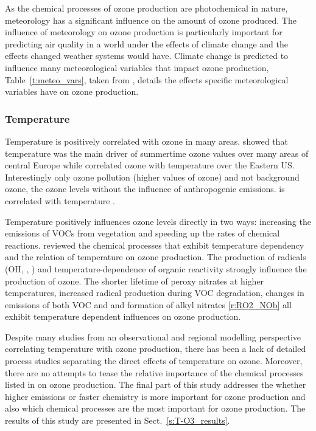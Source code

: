 As the chemical processes of ozone production are photochemical in nature, meteorology has a significant influence on the amount of ozone produced.
The influence of meteorology on ozone production is particularly important for predicting air quality in a world under the effects of climate change and the effects changed weather systems would have.
Climate change is predicted to influence many meteorological variables that impact ozone production, Table~\ref{t:meteo_vars}, taken from \citet{Jacob:2009}, details the effects specific meteorological variables have on ozone production.

\subsubsection{Temperature}
Temperature is positively correlated with ozone in many areas.
\citet{Otero:2016} showed that temperature was the main driver of summertime ozone values over many areas of central Europe while \citet{Camalier:2007} correlated ozone with temperature over the Eastern US.
Interestingly only ozone pollution (higher values of ozone) and not background ozone, the ozone levels without the influence of anthropogenic emissions. is correlated with temperature \citep{Sillman:1995a}.

Temperature positively influences ozone levels directly in two ways: increasing the emissions of VOCs from vegetation and speeding up the rates of chemical reactions.
\citet{Pusede:2015} reviewed the chemical processes that exhibit temperature dependency and the relation of temperature on ozone production.
The production of radicals (OH, , ) and temperature-dependence of organic reactivity strongly influence the production of ozone.
The shorter lifetime of peroxy nitrates at higher temperatures, increased radical production during VOC degradation, changes in emissions of both VOC and  and formation of alkyl nitrates \eqref{r:RO2_NOb} all exhibit temperature dependent influences on ozone production.

Despite many studies from an observational and regional modelling perspective correlating temperature with ozone production, there has been a lack of detailed process studies separating the direct effects of temperature on ozone.
Moreover, there are no attempts to tease the relative importance of the chemical processes listed in \citet{Pusede:2015} on ozone production.
The final part of this study addresses the whether higher emissions or faster chemistry is more important for ozone production and also which chemical processes are the most important for ozone production.
The results of this study are presented in Sect.~\ref{s:T-O3_results}.

